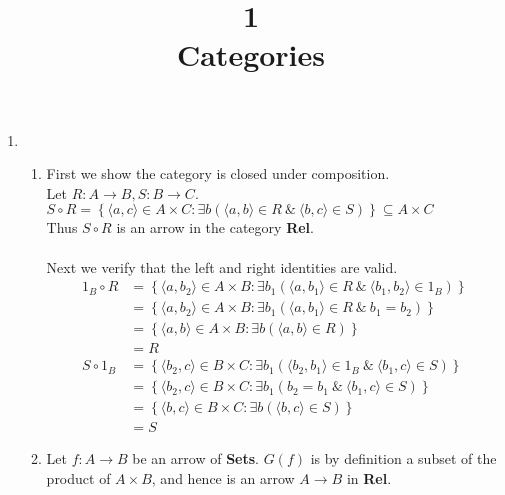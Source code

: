 \documentclass{article} %
\title{\textbf{1}\\Categories}
\newcommand{\set}[1]{\left\{#1\right\}}
\newcommand{\pair}[1]{\langle#1\rangle}
\begin{document}
\maketitle
\begin{enumerate}
	\item \begin{enumerate}
        \item First we show the category is closed under composition.
        \\Let $R:A \rightarrow B, S:B \rightarrow C$.
        \\$S \circ R = 
        \set{ \pair{a,c} \in A \times C : \exists b (\pair{a,b} \in R \:\&\: \pair{b,c} \in S)} \subseteq 
        A \times C$
        \\Thus $S \circ R$ is an arrow in the category \textbf{Rel}.
        \\
        \\ Next we verify that the left and right identities are valid.
        \begin{align*}
            1_B \circ R &= \set{ \pair{a,b_2} \in A \times B : \exists b_1 (\pair{a,b_1} \in R \:\&\: \pair{b_1,b_2} \in 1_B)}
            \\&=\set{ \pair{a,b_2} \in A \times B : \exists b_1 (\pair{a,b_1} \in R \:\&\: b_1=b_2)}
            \\&=\set{ \pair{a,b} \in A \times B : \exists b (\pair{a,b} \in R)}
            \\&=R
            \\S \circ 1_B &= \set{ \pair{b_2,c} \in B \times C : \exists b_1 (\pair{b_2,b_1} \in 1_B \:\&\: \pair{b_1,c} \in S)}
            \\&=\set{ \pair{b_2,c} \in B \times C : \exists b_1 (b_2=b_1 \:\&\: \pair{b_1,c} \in S)}
            \\&=\set{ \pair{b,c} \in B \times C : \exists b (\pair{b,c} \in S)}
            \\&=S
        \end{align*}
        \item Let $f: A \rightarrow B$ be an arrow of \textbf{Sets}. $G(f)$ is by definition a subset of the product of $A \times B$, and hence is an arrow $A \rightarrow B$ in \textbf{Rel}.
    \end{enumerate}
\end{enumerate}
\end{document}
